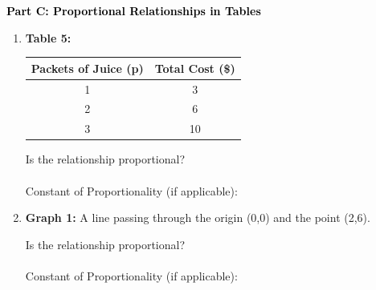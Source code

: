 \documentclass[12pt, letterpaper, fleqn]{article}
\newcommand{\blank}{\underline{\hspace{2.2cm}}}
\begin{document}
\newpage

\begin{tcolorbox}[colback=customteal!20]
\large\textcolor{black}{\textbf{Part C: Proportional Relationships in Tables}}
\end{tcolorbox}

\vspace{3mm}

\begin{enumerate}[itemsep=2.5cm, leftmargin=0.6cm, resume]
\item \begin{tcolorbox}[colback=white, colframe=black, width=\textwidth]

\textbf{Table 5:}
\vspace{2mm}
\begin{center}
\begin{tabular}{|c|c|}
\hline
Packets of Juice (p) & Total Cost (\$) \\
\hline
1 & 3 \\
2 & 6 \\
3 & 10 \\
\hline
\end{tabular}
\end{center}
\vspace{1cm}
Is the relationship proportional? \blank \\ \\
Constant of Proportionality (if applicable): \blank
\end{tcolorbox}
\item \begin{tcolorbox}[colback=white, colframe=black, width=\textwidth]
\textbf{Graph 1:} A line passing through the origin (0,0) and the point (2,6).
\vspace{2mm}
\begin{center}
\end{center}
\vspace{0.2cm}
Is the relationship proportional? \blank \\ \\
Constant of Proportionality (if applicable): \blank
\end{tcolorbox}

\vspace{0.5cm}
\end{enumerate}
\end{document}
